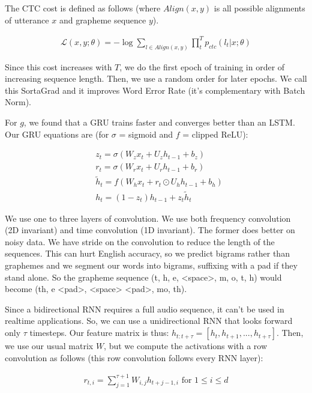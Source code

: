 \documentclass[a4paper]{article}
\begin{document}
The CTC cost is defined as follows (where $Align(x, y)$ is all possible
alignments of utterance $x$ and grapheme sequence $y$).

\begin{align}
  \mathcal{L}(x, y; \theta) = - \log \sum_{l \in Align(x, y)}{
  \prod_{t}^{T}{p_{ctc}(l_t | x; \theta)}
  }
\end{align}

Since this cost increases with $T$, we do the first epoch of training in order
of increasing sequence length. Then, we use a random order for later epochs.
We call this SortaGrad and it improves Word Error Rate (it's complementary
with Batch Norm).

For $g$, we found that a GRU trains faster and converges better than an LSTM.
Our GRU equations are (for $\sigma$ = sigmoid and $f$ = clipped ReLU):

\begin{align}
  & z_t = \sigma(W_z x_t + U_z h_{t-1} + b_z) \\
  & r_t = \sigma(W_r x_t + U_r h_{t-1} + b_r) \\
  & \tilde{h}_t = f(W_h x_t + r_t \odot U_h h_{t-1} + b_h) \\
  & h_t = (1 - z_t) h_{t-1} + z_t \tilde{h}_t
\end{align}

We use one to three layers of convolution. We use both frequency convolution
(2D invariant) and time convolution (1D invariant). The former does better on
noisy data. We have stride on the convolution to reduce the length of the
sequences. This can hurt English accuracy, so we predict bigrams rather than
graphemes and we segment our words into bigrams, suffixing with a pad if they
stand alone. So the grapheme sequence (t, h, e, <space>, m, o, t, h) would
become (th, e <pad>, <space> <pad>, mo, th).

Since a bidirectional RNN requires a full audio sequence, it can't be used
in realtime applications. So, we can use a unidirectional RNN that looks forward
only $\tau$ timesteps. Our feature matrix is thus: $h_{t:t+\tau} = [h_t,
h_{t+1}, ..., h_{t+\tau}]$. Then, we use our usual matrix $W$,
but we compute the activations with a row convolution as follows (this row
convolution follows every RNN layer):

\begin{align}
  r_{t, i} = \sum_{j=1}^{\tau + 1}{W_{i, j} h_{t+j-1, i}}
  \text{ for $1 \leq i \leq d$}
\end{align}
\end{document}
